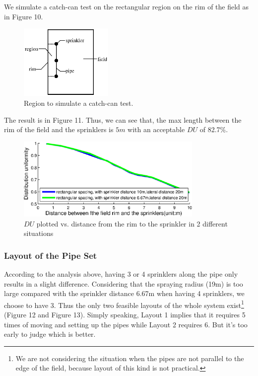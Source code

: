 \documentclass[12pt,a4paper,titlepage]{article}
\begin{document}
We simulate a catch-can test on the rectangular region on the rim
of the field as in Figure 10.

\begin{figure}[!htb]
\centering
\includegraphics[width=0.4\textwidth]{fig10.eps} \caption{\label{fig10} Region to simulate a catch-can test.}
\end{figure}

The result is in Figure 11. Thus, we can see that, the max length
between the rim of the field and the sprinklers is $5m$ with an
acceptable $DU$ of 82.7\%.

\begin{figure}[!htb]
\centering
\includegraphics[width=0.8\textwidth]{fig11.eps} \caption{\label{fig11} $DU$ plotted vs. distance from the rim to the sprinkler
in 2 different situations }
\end{figure}


\subsubsection{Layout of the Pipe Set}

According to the analysis above, having 3 or 4 sprinklers along
the pipe only results in a slight difference. Considering that the
spraying radius (19m) is too large compared with the sprinkler
distance 6.67m when having 4 sprinklers, we choose to have 3. Thus
the only two feasible layouts of the whole system
exist\footnote{We are not considering the situation when the pipes
are not parallel to the edge of the field, because layout of this
kind is not practical.} (Figure 12 and Figure 13). Simply
speaking, Layout 1 implies that it requires 5 times of moving and
setting up the pipes while Layout 2 requires 6. But it's too early
to judge which is better.
\end{document}

